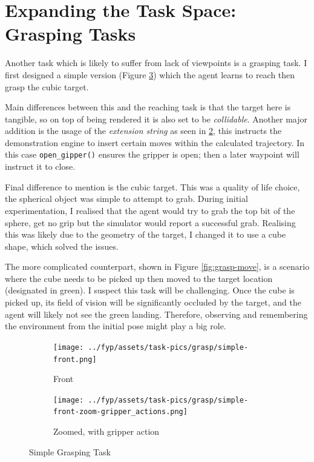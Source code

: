\section{Expanding the Task Space: Grasping Tasks}\label{sec:grasping-tasks}
Another task which is likely to suffer from lack of viewpoints is a grasping task. I first designed
a simple version (Figure \ref{fig:grasp-simple}) which the agent learns to reach then grasp the cubic target. 

Main differences between this and the reaching task is that the target here is tangible, so on top of being rendered it is also set to be \emph{collidable}. Another major addition is the usage of the \emph{extension string} as seen in \ref{subfig:simple-zoom-actions}, this instructs the demonstration engine to insert certain moves within the calculated trajectory. In this case \verb|open_gipper()| ensures the gripper is open; then a later waypoint will instruct it to close. 

Final difference to mention is the cubic target. This was a quality of life choice, the spherical object was simple to attempt to grab. During initial experimentation, I realised that the agent would try to grab the top bit of the sphere, get no grip but the simulator would report a successful grab. Realising this was likely due to the geometry of the target, I changed it to use a cube shape, which solved the issues.\todo[color=purple]{}


The more complicated counterpart, shown in Figure \ref{fig:grasp-move}, is a scenario where the cube needs to be picked up then moved to the target location (designated in green). I suspect this task will be challenging. Once the cube is picked up, its field of vision will be significantly occluded by the target, and the agent will likely not see the green landing. Therefore, observing and remembering the environment from the initial pose might play a big role.

\begin{figure}[htpb] %
  \centering
  \begin{subfigure}{0.3\linewidth}
    \centering
    \texttt{[image: ../fyp/assets/task-pics/grasp/simple-front.png]}
    \caption{Front}\label{subfig:simple-front}
  \end{subfigure}
  \begin{subfigure}{0.5\linewidth}
    \centering
    \texttt{[image: ../fyp/assets/task-pics/grasp/simple-front-zoom-gripper\_actions.png]}
    \caption{Zoomed, with gripper action}\label{subfig:simple-zoom-actions}
  \end{subfigure}
  \caption{Simple Grasping Task}\label{fig:grasp-simple}
\end{figure}

